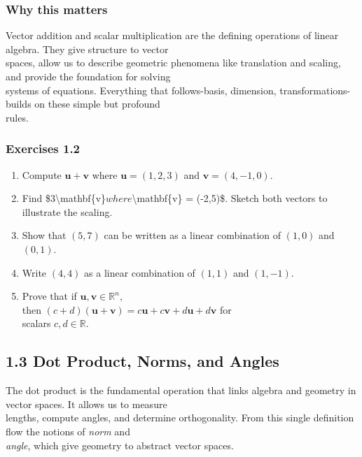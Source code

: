 \documentclass[
  12pt,
  a4paper,
]{article}
\begin{document}
\subsubsection{Why this matters}\label{why-this-matters}

Vector addition and scalar multiplication are the defining operations of
linear algebra. They give structure to vector\\
spaces, allow us to describe geometric phenomena like translation and
scaling, and provide the foundation for solving\\
systems of equations. Everything that follows-basis, dimension,
transformations-builds on these simple but profound\\
rules.

\subsubsection{Exercises 1.2}\label{exercises-12}

\begin{enumerate}
\def\labelenumi{\arabic{enumi}.}
\item
  Compute \(\mathbf{u} + \mathbf{v}\) where \(\mathbf{u} = (1,2,3)\) and
  \(\mathbf{v} = (4, -1, 0)\).
\item
  Find
  \$3\textbackslash mathbf\{v\}\( where \)\textbackslash mathbf\{v\} =
  (-2,5)\$. Sketch both vectors to illustrate the scaling.
\item
  Show that \((5,7)\) can be written as a linear combination of
  \((1,0)\) and \((0,1)\).
\item
  Write \((4,4)\) as a linear combination of \((1,1)\) and \((1,-1)\).
\item
  Prove that if \(\mathbf{u}, \mathbf{v} \in \mathbb{R}^n\),\\
  then
  \((c+d)(\mathbf{u}+\mathbf{v}) = c\mathbf{u} + c\mathbf{v} + d\mathbf{u} + d\mathbf{v}\)
  for\\
  scalars \(c,d \in \mathbb{R}\).
\end{enumerate}

\subsection{1.3 Dot Product, Norms, and
Angles}\label{13-dot-product-norms-and-angles}

The dot product is the fundamental operation that links algebra and
geometry in vector spaces. It allows us to measure\\
lengths, compute angles, and determine orthogonality. From this single
definition flow the notions of \emph{norm} and\\
\emph{angle}, which give geometry to abstract vector spaces.
\end{document}
